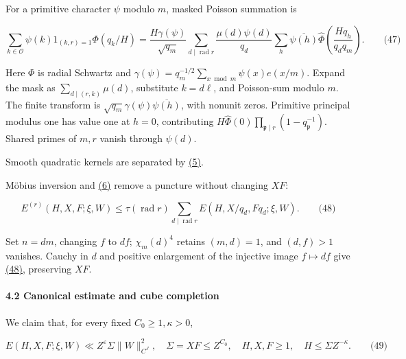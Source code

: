 For a primitive character \(\psi\) modulo \(m\), masked Poisson summation is

\hypertarget{cf:eq:C.3}{}

\label{cf:eq:C.3}

\[
\sum_{k\in\mathcal O}\psi(k)1_{(k,r)=1}\Phi(q_k/H)
=\frac{H\gamma(\psi)}{\sqrt{q_m}}
\sum_{d\mid\operatorname{rad}r}\frac{\mu(d)\psi(d)}{q_d}
\sum_h\overline{\psi(h)}\widehat\Phi\!\left(\frac{Hq_h}{q_dq_m}\right).
\qquad\text{(47)}
\]

Here \(\Phi\) is radial Schwartz and \(\gamma(\psi)=q_m^{-1/2}\sum_{x\bmod m}\psi(x)e(x/m)\). Expand the mask as \(\sum_{d\mid(r,k)}\mu(d)\), substitute \(k=d\ell\), and Poisson-sum modulo \(m\). The finite transform is \(\sqrt{q_m}\gamma(\psi)\overline{\psi(h)}\), with nonunit zeros. Primitive principal modulus one has value one at \(h=0\), contributing \(H\widehat\Phi(0)\prod_{\mathfrak p\mid r}(1-q_{\mathfrak p}^{-1})\). Shared primes of \(m,r\) vanish through \(\psi(d)\).

Smooth quadratic kernels are separated by \protect\hyperlink{cf:eq:1.4}{(5)}.

Möbius inversion and \protect\hyperlink{cf:eq:A.1}{(6)} remove a puncture without changing \(XF\):

\hypertarget{cf:eq:C.4}{}

\label{cf:eq:C.4}

\[
E^{(r)}(H,X,F;\xi,W)
\le\tau(\operatorname{rad}r)
\sum_{d\mid\operatorname{rad}r}E(H,X/q_d,Fq_d;\xi,W).
\qquad\text{(48)}
\]

Set \(n=dm\), changing \(f\) to \(df\); \(\chi_m(d)^4\) retains \((m,d)=1\), and \((d,f)>1\) vanishes. Cauchy in \(d\) and positive enlargement of the injective image \(f\mapsto df\) give \protect\hyperlink{cf:eq:C.4}{(48)}, preserving \(XF\).

\hypertarget{cf:sec:C.2}{}

\label{cf:sec:C.2}

\hypertarget{canonical-estimate-and-cube-completion}{%
\paragraph{4.2 Canonical estimate and cube completion}\label{canonical-estimate-and-cube-completion}}

We claim that, for every fixed \(C_0\ge1,\kappa>0\),

\hypertarget{cf:eq:C.5}{}

\label{cf:eq:C.5}

\[
E(H,X,F;\xi,W)\ll Z^\varepsilon\Sigma\|W\|_{C^J}^2,
\quad \Sigma=XF\le Z^{C_0},\quad
H,X,F\ge1,\quad H\le\Sigma Z^{-\kappa}.
\qquad\text{(49)}
\]

